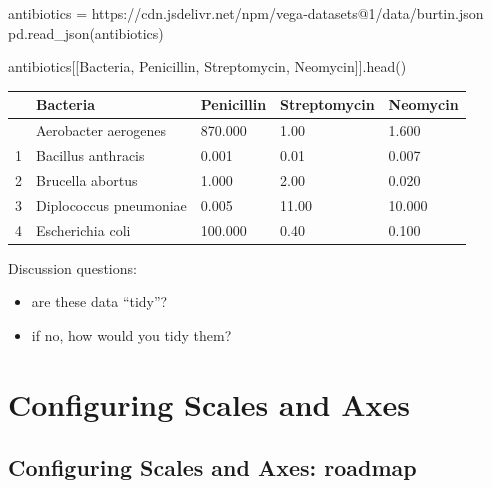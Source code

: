 \documentclass[
  letterpaper,
  DIV=11,
  numbers=noendperiod]{scrartcl}
\newenvironment{Shaded}{\begin{snugshade}}{\end{snugshade}}
\newcommand{\NormalTok}[1]{\textcolor[rgb]{0.00,0.23,0.31}{#1}}
\newcommand{\OperatorTok}[1]{\textcolor[rgb]{0.37,0.37,0.37}{#1}}
\newcommand{\StringTok}[1]{\textcolor[rgb]{0.13,0.47,0.30}{#1}}
\providecommand{\tightlist}{%
  \setlength{\itemsep}{0pt}\setlength{\parskip}{0pt}}\usepackage{longtable,booktabs,array}
\begin{document}
\begin{Shaded}
\begin{Highlighting}[]
\NormalTok{antibiotics }\OperatorTok{=} \StringTok{\textquotesingle{}https://cdn.jsdelivr.net/npm/vega{-}datasets@1/data/burtin.json\textquotesingle{}}
\NormalTok{pd.read\_json(antibiotics)}
\end{Highlighting}
\end{Shaded}

\begin{Shaded}
\begin{Highlighting}[]
\NormalTok{antibiotics[[}\StringTok{\textquotesingle{}Bacteria\textquotesingle{}}\NormalTok{, }\StringTok{\textquotesingle{}Penicillin\textquotesingle{}}\NormalTok{, }\StringTok{\textquotesingle{}Streptomycin\textquotesingle{}}\NormalTok{, }\StringTok{\textquotesingle{}Neomycin\textquotesingle{}}\NormalTok{]].head()}
\end{Highlighting}
\end{Shaded}

\begin{longtable}[]{@{}lllll@{}}
\toprule\noalign{}
& Bacteria & Penicillin & Streptomycin & Neomycin \\
\midrule\noalign{}
\endhead
\bottomrule\noalign{}
\endlastfoot
0 & Aerobacter aerogenes & 870.000 & 1.00 & 1.600 \\
1 & Bacillus anthracis & 0.001 & 0.01 & 0.007 \\
2 & Brucella abortus & 1.000 & 2.00 & 0.020 \\
3 & Diplococcus pneumoniae & 0.005 & 11.00 & 10.000 \\
4 & Escherichia coli & 100.000 & 0.40 & 0.100 \\
\end{longtable}

Discussion questions:

\begin{itemize}
\tightlist
\item
  are these data ``tidy''?
\item
  if no, how would you tidy them?
\end{itemize}

\section{Configuring Scales and Axes}\label{configuring-scales-and-axes}

\subsection{Configuring Scales and Axes:
roadmap}\label{configuring-scales-and-axes-roadmap}
\end{document}
